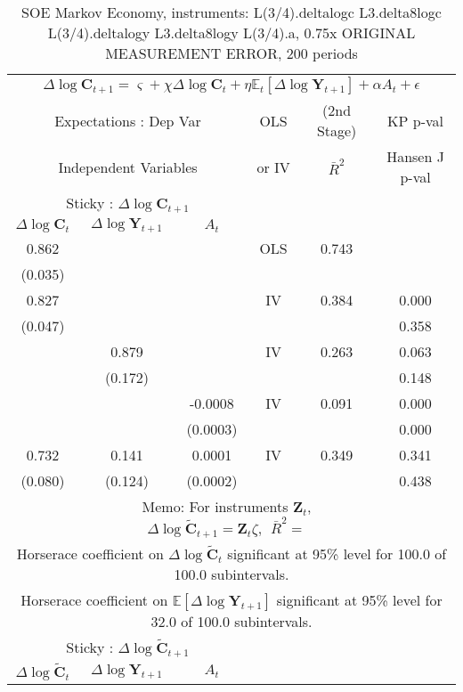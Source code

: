 \begin{table}\caption{SOE Markov Economy, instruments: L(3/4).deltalogc L3.delta8logc L(3/4).deltalogy L3.delta8logy L(3/4).a, 0.75x ORIGINAL MEASUREMENT ERROR, 200 periods}
\begin{tabular}{cccccc}
 \hline \hline\multicolumn{6}{c}{$ \Delta \log \mathbf{C}_{t+1} = \varsigma + \chi \Delta \log \mathbf{C}_t + \eta \mathbb{E}_t[\Delta \log \mathbf{Y}_{t+1}] + \alpha A_t + \epsilon $ } 
\\ \multicolumn{3}{c}{Expectations : Dep Var} & OLS &  (2nd Stage) & KP p-val 
\\ \multicolumn{3}{c}{Independent Variables} & or IV & $ \bar{R}^{2} $ & Hansen J p-val 
\\ \hline \multicolumn{3}{c}{Sticky : $\Delta \log \mathbf{C}_{t+1}$} %
\\ \multicolumn{1}{c}{$\Delta \log {\mathbf{C}}_{t}$} & \multicolumn{1}{c}{$\Delta \log \mathbf{Y}_{t+1}$} & \multicolumn{1}{c}{$A_{t}$} 
\\  0.862 & & & OLS & 0.743 & %
\\  (0.035) & & & & & %
\\  0.827 & & & IV & 0.384 & 0.000
\\  (0.047) & & & & & 0.358
\\ & 0.879 & & IV & 0.263 & 0.063
\\ & (0.172) & & & & 0.148
\\ & & -0.0008 & IV & 0.091 & 0.000
\\ & & (0.0003) & & & 0.000
\\ 0.732 & 0.141 & 0.0001 & IV & 0.349 & 0.341
\\ (0.080) & (0.124) & (0.0002) & & & 0.438
\\ & \multicolumn{4}{c}{Memo: For instruments $\mathbf{Z}_{t}$,  $\Delta \log \widetilde{\mathbf{C}}_{t+1} = \mathbf{Z}_{t} \zeta,~~\bar{R}^{2}=$ } 0.375 & 
\\ \multicolumn{6}{c}{Horserace coefficient on $\Delta \log \widetilde{\mathbf{C}}_t$ significant at 95\% level for 100.0 of 100.0 subintervals.} 
\\ \multicolumn{6}{c}{Horserace coefficient on $\mathbb{E}[\Delta \log \mathbf{Y}_{t+1}]$ significant at 95\% level for 32.0 of 100.0 subintervals.} 
\\ \hline \multicolumn{3}{c}{Sticky : $\Delta \log \widetilde{\mathbf{C}}_{t+1} $}%
\\ \multicolumn{1}{c}{$\Delta \log {\widetilde{\mathbf{C}}}_{t}$} & \multicolumn{1}{c}{$\Delta \log \mathbf{Y}_{t+1}$} & \multicolumn{1}{c}{$A_{t}$} 

\end{tabular}
\end{table}
